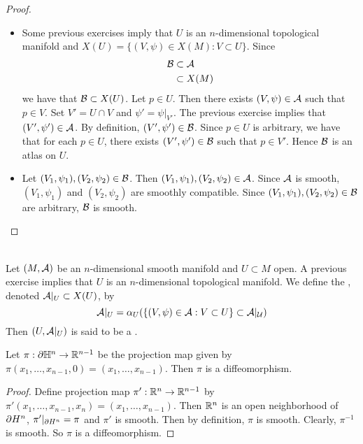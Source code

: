 \documentclass{book}
\begin{document}
\begin{proof}\
	\begin{itemize}
		\item Some previous exercises imply that $U$ is an $n$-dimensional topological manifold and $X(U) = \{(V, \psi) \in X(M): V \subset U\}$. Since 
		\begin{align*}
			\mathcal{B} 
			& \subset \mathcal{A} \\
			& \subset X(M)
		\end{align*}
		we have that $\mathcal{B} \subset X(U)$. Let $p \in U$. Then there exists $(V, \psi) \in \mathcal{A}$ such that $p \in V$. Set $V' = U \cap V$ and $\psi' = \psi|_{V'}$. The previous exercise implies that $(V', \psi') \in \mathcal{A}$. By definition, $(V', \psi') \in \mathcal{B}$. Since $p \in U$ is arbitrary, we have that for each $p \in U$, there exists $(V', \psi') \in \mathcal{B}$ such that $p \in V'$. Hence $\mathcal{B}$ is an atlas on $U$. 
		\item Let $(V_1, \psi_1), (V_2, \psi_2) \in \mathcal{B}$. Then $(V_1, \psi_1), (V_2, \psi_2) \in \mathcal{A}$. Since $\mathcal{A}$ is smooth, $(V_1, \psi_1)$ and $(V_2, \psi_2)$ are smoothly compatible. Since $(V_1, \psi_1), (V_2, \psi_2) \in \mathcal{B}$ are arbitrary, $\mathcal{B}$ is smooth.
	\end{itemize}
\end{proof}

\begin{defn}  \\
	Let $(M, \mathcal{A})$ be an $n$-dimensional smooth manifold and $U \subset M$ open. A previous exercise implies that $U$ is an $n$-dimensional topological manifold. We define the , denoted $\mathcal{A}|_{U} \subset X(U)$, by 
	$$\mathcal{A}|_{U} = \alpha_U(\{(V, \psi) \in \mathcal{A}: V \subset U\} \subset \mathcal{A}|_{\mathcal{U}})$$
	Then $(U, \mathcal{A}|_{U})$ is said to be a .
\end{defn}

\begin{ex}
	Let $\pi: \partial \mathbb{H}^n \rightarrow \mathbb{R}^{n-1}$ be the projection map given by $\pi(x_1, \ldots, x_{n-1}, 0) = (x_1, \ldots, x_{n-1})$. Then $\pi$ is a diffeomorphism. 
\end{ex}

\begin{proof}
	Define projection map $\pi': \mathbb{R}^n \rightarrow \mathbb{R}^{n-1}$ by $\pi'(x_1, \ldots, x_{n-1}, x_n) = (x_1, \ldots, x_{n-1})$. Then $\mathbb{R}^n$ is an open neighborhood of $\partial H^n$, $\pi'|_{\partial H^n} = \pi$ and $\pi'$ is smooth. Then by definition, $\pi$ is smooth. Clearly, $\pi^{-1}$ is smooth. So $\pi$ is a diffeomorphism.
\end{proof}
\end{document}
